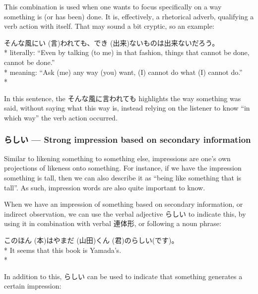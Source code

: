 \documentclass[11pt, b5paper, twoside, openright, onecolumn]{book}
\makeatletter
\newcommand*{\rubystack}[2]{{\relscale{0.5}%
  \begin{tabular}[b]{@{}c@{}}%
    {#1}\\%
   {\textscale{2}{#2}}%
  \end{tabular}}%
}
\DeclareRobustCommand*{\ruby}[2]{%
  \mbox{%
    \setlength{\parskip}{0ex}%
    \BeginAccSupp{method=pdfstringdef,ActualText={#1}}%
      \rubystack{\phantom{#2}}{#1}%
      \llap{%
        \rubystack{#2}{\phantom{#1}}%
      }%
    \EndAccSupp{}%
  }%
}
\renewcommand*{\ruby}[2]{#2 (#1)}%
\newenvironment{exampleblock}{
\setlength{\parindent}{0.6in}
\begin{minipage}[t]{\dimexpr\textwidth-\parindent}}
{\end{minipage}}
\makeatother
\begin{document}
This combination is used when one wants to focus specifically on a way something is (or has been) done. It is‚ effectively‚ a rhetorical adverb‚ qualifying a verb action with itself. That may sound a bit cryptic‚ so an example:

\vspace{0.4cm}
\begin{exampleblock}
そんな風に\ruby{言}{い}われても、\ruby{出来}{でき}ないものは出来ないだろう。 \\* 
literally: “Even by talking (to me) in that fashion‚ things that cannot be done‚ cannot be done.” \\* 
meaning: “Ask (me) any way (you) want‚ (I) cannot do what (I) cannot do.” \\* 
\end{exampleblock}
\vspace{0.2cm}

In this sentence‚ the そんな風に言われても highlights the way something was said‚ without saying what this way is‚ instead relying on the listener to know “in which way” the verb action occurred.

\subsubsection{らしい — Strong impression based on secondary information}

Similar to likening something to something else‚ impressions are one’s own projections of likeness onto something. For instance‚ if we have the impression something is tall‚ then we can also describe it as “being like something that is tall”. As such‚ impression words are also quite important to know.

When we have an impression of something based on secondary information‚ or indirect observation‚ we can use the verbal adjective らしい to indicate this‚ by using it in combination with verbal 連体形‚ or following a noun phrase:

\vspace{0.4cm}
\begin{exampleblock}
この\ruby{本}{ほん}は\ruby{山田}{やまだ}\ruby{君}{くん}のらしい(です)。 \\* 
It seems that this book is Yamada’s. \\* 
\end{exampleblock}
\vspace{0.2cm}

In addition to this‚ らしい can be used to indicate that something generates a certain impression:
\end{document}
